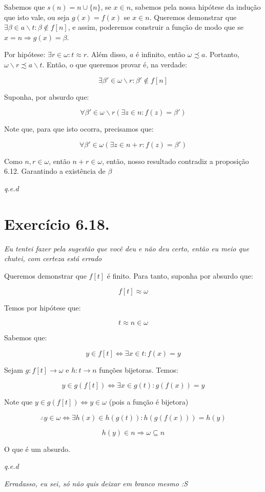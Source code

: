 \documentclass[12pt]{extarticle}
\newcommand{\fim}{\begin{flushright}

   \emph{q.e.d}
\end{flushright}}
\begin{document}
Sabemos que $s(n) = n \cup \{n\}$, se $x \in n$, sabemos pela nossa hipótese da indução que isto vale, ou seja $g(x) = f(x)$ se $x \in n$. Queremos demonstrar que $\exists \beta \in a \backslash t : \beta \notin f[n]$, e assim, poderemos construir a função de modo que se $x = n \Rightarrow g(x) = \beta$.

Por hipótese: $\exists r \in \omega : t \approx r$. Além disso, $a$ é infinito, então $\omega \precsim a$. Portanto, $\omega \backslash r \precsim a \backslash t$. Então, o que queremos provar é, na verdade:

$$
\exists \beta' \in \omega \backslash r : \beta' \notin f[n]
$$

Suponha, por absurdo que:

$$
\forall \beta' \in \omega \backslash r ( \exists z \in n : f(z) = \beta')
$$

Note que, para que isto ocorra, precisamos que:

$$
\forall \beta' \in \omega (\exists z \in n + r : f(z) = \beta') 
$$

Como $n,r \in \omega$, então $n+r \in \omega$, então, nosso resultado contradiz a proposição 6.12. Garantindo a existência de $\beta$

\fim

\section{Exercício 6.18.}

\textit{Eu tentei fazer pela sugestão que você deu e não deu certo, então eu meio que chutei, com certeza está errado}

Queremos demonstrar que $f[t]$ é finito. Para tanto, suponha por absurdo que:

$$
f[t] \approx \omega
$$

Temos por hipótese que:

$$
t \approx n \in \omega
$$

Sabemos que:

$$
y \in f[t] \Leftrightarrow \exists x \in t : f(x) = y
$$

Sejam $g:f[t] \rightarrow \omega$ e $h: t \rightarrow n$ funções bijetoras. Temos:

$$
y \in g(f[t]) \Leftrightarrow \exists x \in g(t): g(f(x)) = y
$$

Note que $y \in g(f[t]) \Leftrightarrow y \in \omega$ (pois a função é bijetora)

$$
\therefore y \in \omega \Leftrightarrow \exists h(x) \in h(g(t)) : h(g(f(x))) = h(y)
$$

$$
h(y) \in n \Rightarrow \omega \subseteq n
$$

O que é um absurdo.

\fim

\textit{Erradasso, eu sei, só não quis deixar em branco mesmo :S}
\end{document}
